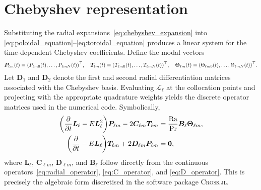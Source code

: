 \documentclass[11pt]{article}
\numberwithin{equation}{section}
\begin{document}
\section{Chebyshev representation}
Substituting the radial expansions~\eqref{eq:chebyshev_expansion} into \eqref{eq:poloidal_equation}--\eqref{eq:toroidal_equation} produces a linear system for the time-dependent Chebyshev coefficients. Define the modal vectors
\begin{equation}
  \bm{P}_{\ell m}(t) = \qty(P_{\ell m 0}(t), \ldots, P_{\ell m N}(t))^\top, \quad
  \bm{T}_{\ell m}(t) = \qty(T_{\ell m 0}(t), \ldots, T_{\ell m N}(t))^\top,
  \quad
  \bm{\Theta}_{\ell m}(t) = \qty(\Theta_{\ell m 0}(t), \ldots, \Theta_{\ell m N}(t))^\top.
\end{equation}
Let $\bm{D}_1$ and $\bm{D}_2$ denote the first and second radial differentiation matrices associated with the Chebyshev basis. Evaluating $\mathcal{L}_\ell$ at the collocation points and projecting with the appropriate quadrature weights yields the discrete operator matrices used in the numerical code. Symbolically,
\begin{align}
  \qty(\pdv{}{t} \bm{L}_\ell - E \bm{L}_\ell^2) \bm{P}_{\ell m} - 2 \bm{C}_{\ell m} \bm{T}_{\ell m}
  &= \frac{\mathrm{Ra}}{\mathrm{Pr}} \bm{B}_\ell \bm{\Theta}_{\ell m}, \\
  \qty(\pdv{}{t} - E \bm{L}_\ell) \bm{T}_{\ell m}
  + 2 \bm{D}_{\ell m} \bm{P}_{\ell m}
  &= \bm{0},
\end{align}
where $\bm{L}_\ell$, $\bm{C}_{\ell m}$, $\bm{D}_{\ell m}$, and $\bm{B}_\ell$ follow directly from the continuous operators~\eqref{eq:radial_operator}, \eqref{eq:C_operator}, and \eqref{eq:D_operator}. This is precisely the algebraic form discretised in the software package \textsc{Cross.jl}.
\end{document}
